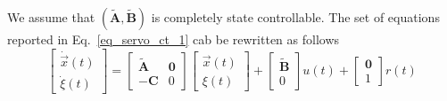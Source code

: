 \documentclass[11pt,a4paper,oneside]{book}
\numberwithin{equation}{section}
\theoremstyle{it}
\theoremstyle{definition}
\begin{document}
We assume that $(\tilde{\mathbf{A}},\tilde{\mathbf{B}})$ is completely state 
controllable.
The set of equations reported in Eq.~\eqref{eq_servo_ct_1} cab be rewritten as 
follows
\begin{equation}\label{eq_servo_ct_2}
	\begin{bmatrix}
		\dot{\vec{x}}(t) \\[6pt] \dot{\xi}(t)
	\end{bmatrix} = 
	\begin{bmatrix}
		\tilde{\mathbf{A}} & \mathbf{0} \\[6pt]
		-{\mathbf{C}} & 0
	\end{bmatrix} 
	\begin{bmatrix}
		{\vec{x}}(t) \\[6pt] {\xi}(t)
	\end{bmatrix}+
	\begin{bmatrix}
		\tilde{\mathbf{B}} \\[6pt] 0
	\end{bmatrix}u(t)+
	\begin{bmatrix}
		{\mathbf{0}} \\[6pt] 1
	\end{bmatrix}r(t)
\end{equation}
\end{document}
